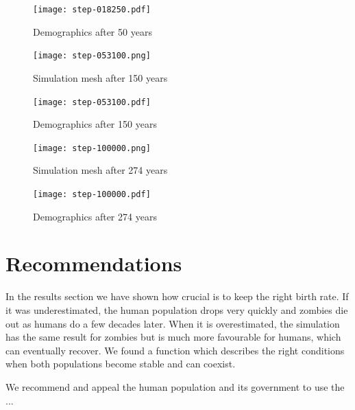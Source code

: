 \documentclass[a4paper]{article}
\begin{document}
\begin{figure}[pht]
    \centering
    \texttt{[image: step-018250.pdf]}
    \caption{Demographics after 50 years}
\end{figure}

\begin{figure}[pht]
    \centering
    \texttt{[image: step-053100.png]}
    \caption{Simulation mesh after 150 years}
\end{figure}

\begin{figure}[pht]
    \centering
    \texttt{[image: step-053100.pdf]}
    \caption{Demographics after 150 years}
\end{figure}

\begin{figure}[pht]
    \centering
    \texttt{[image: step-100000.png]}
    \caption{Simulation mesh after 274 years}
\end{figure}

\begin{figure}[pht]
    \centering
    \texttt{[image: step-100000.pdf]}
    \caption{Demographics after 274 years}
\end{figure}

\section{Recommendations}

In the results section we have shown how crucial is to keep the right birth rate.
If it was underestimated, the human population drops very quickly and zombies die out as humans do a few decades later.
When it is overestimated, the simulation has the same result for zombies but is much more favourable for humans, which can eventually recover.
We found a function which describes the right conditions when both populations become stable and can coexist.

We recommend and appeal the human population and its government to use the ...



\begingroup
\raggedright



\endgroup
\end{document}
